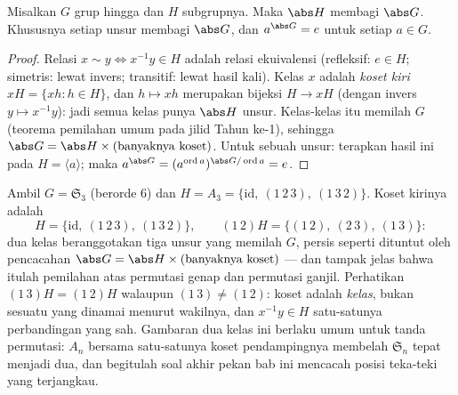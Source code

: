 \begin{theorem}[Lagrange]\label{thm:b2:structures:lagrange}
Misalkan $G$ grup hingga dan $H$ subgrupnya. Maka $\abs H$ membagi
$\abs G$. Khususnya  setiap unsur membagi
$\abs G$, dan $a^{\abs G} = e$ untuk setiap $a \in G$.
\end{theorem}

\begin{proof}
Relasi $x \sim y \iff x^{-1}y \in H$ adalah relasi ekuivalensi
(refleksif: $e \in H$; simetris: lewat invers; transitif: lewat hasil
kali). Kelas $x$ adalah \emph{koset kiri} $xH = \{xh : h \in H\}$,
dan $h \mapsto xh$ merupakan bijeksi $H \to xH$ (dengan invers $y \mapsto
x^{-1}y$): jadi semua kelas punya $\abs H$ unsur. Kelas-kelas itu
memilah $G$ (teorema pemilahan umum pada jilid Tahun ke-1), sehingga
$\abs G = \abs H \times (\text{banyaknya koset})$. Untuk sebuah unsur:
terapkan hasil ini pada $H = \langle a\rangle$; maka $a^{\abs G} =
(a^{\operatorname{ord} a})^{\abs G / \operatorname{ord} a} = e$.
\end{proof}

\begin{example}\label{ex:b2:structures:cosets}
Ambil $G = \mathfrak{S}_3$ (berorde $6$) dan $H = A_3 =
\{\mathrm{id},\ (1\,2\,3),\ (1\,3\,2)\}$. Koset kirinya adalah
\[
H = \{\mathrm{id},\ (1\,2\,3),\ (1\,3\,2)\},
\qquad
(1\,2)H = \{(1\,2),\ (2\,3),\ (1\,3)\} :
\]
dua kelas beranggotakan tiga unsur yang memilah $G$, persis seperti
dituntut oleh pencacahan $\abs G = \abs H \times (\text{banyaknya koset})$
--- dan tampak jelas bahwa itulah pemilahan atas permutasi genap dan
permutasi ganjil. Perhatikan $(1\,3)H = (1\,2)H$ walaupun $(1\,3) \neq
(1\,2)$: koset adalah \emph{kelas}, bukan sesuatu yang dinamai menurut
wakilnya, dan $x^{-1}y \in H$ satu-satunya perbandingan yang sah.
Gambaran dua kelas ini berlaku umum untuk tanda permutasi: $A_n$
bersama satu-satunya koset pendampingnya membelah $\mathfrak{S}_n$ tepat
menjadi dua, dan begitulah soal akhir pekan bab ini mencacah posisi
teka-teki yang terjangkau.
\end{example}

